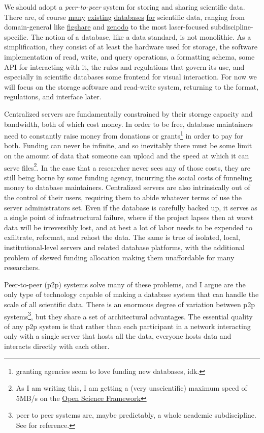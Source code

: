 \documentclass[11pt]{article}
\begin{document}
\begin{multicols}{2}
We should adopt a \emph{peer-to-peer} system for storing and sharing
scientific data. There are, of course
\href{https://www.dandiarchive.org/}{many}
\href{https://openneuro.org/}{existing}
\href{https://www.brainminds.riken.jp/}{databases}
\href{https://biccn.org/}{for} scientific data, ranging from
domain-general like \href{https://figshare.com/}{figshare} and
\href{https://zenodo.org/}{zenodo} to the most laser-focused
subdiscipline-specific. The notion of a database, like a data standard,
is not monolithic. As a simplification, they consist of at least the
hardware used for storage, the software implementation of read, write,
and query operations, a formatting schema, some API for interacting with
it, the rules and regulations that govern its use, and especially in
scientific databases some frontend for visual interaction. For now we
will focus on the storage software and read-write system, returning to
the format, regulations, and interface later.

Centralized servers are fundamentally constrained by their storage
capacity and bandwidth, both of which cost money. In order to be free,
database maintainers need to constantly raise money from donations or
grants\footnote{granting agencies seem to love funding new databases,
  idk.} in order to pay for both. Funding can never be infinite, and so
inevitably there must be some limit on the amount of data that someone
can upload and the speed at which it can serve files\footnote{As I am
  writing this, I am getting a (very unscientific) maximum speed of
  5MB/s on the \href{https://osf.io}{Open Science Framework}}. In the
case that a researcher never sees any of those costs, they are still
being borne by some funding agency, incurring the social costs of
funneling money to database maintainers. Centralized servers are also
intrinsically out of the control of their users, requiring them to abide
whatever terms of use the server administrators set. Even if the
database is carefully backed up, it serves as a single point of
infrastructural failure, where if the project lapses then at worst data
will be irreversibly lost, and at best a lot of labor needs to be
expended to exfiltrate, reformat, and rehost the data. The same is true
of isolated, local, institutional-level servers and related database
platforms, with the additional problem of skewed funding allocation
making them unaffordable for many researchers.

Peer-to-peer (p2p) systems solve many of these problems, and I argue are
the only type of technology capable of making a database system that can
handle the scale of all scientific data. There is an enormous degree of
variation between p2p systems\footnote{peer to peer systems are, maybe
  predictably, a whole academic subdiscipline. See \cite{shenHandbookPeertoPeerNetworking2010}  for reference.}, but they
share a set of architectural advantages. The essential quality of any
p2p system is that rather than each participant in a network interacting
only with a single server that hosts all the data, everyone hosts data
and interacts directly with each other.


\end{multicols}
\end{document}
